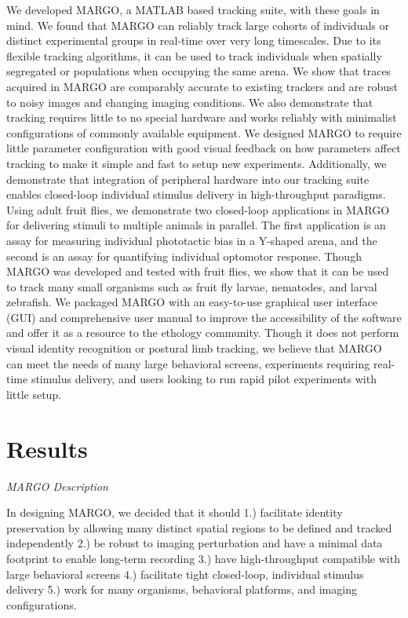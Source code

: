 \documentclass[10pt]{article}
\begin{document}
\begin{multicols}{2}
We developed MARGO, a MATLAB based tracking suite, with these goals in mind. We found that MARGO can reliably track large cohorts of individuals or distinct experimental groups in real-time over very long timescales. Due to its flexible tracking algorithms, it can be used to track individuals when spatially segregated or populations when occupying the same arena. We show that traces acquired in MARGO are comparably accurate to existing trackers and are robust to noisy images and changing imaging conditions. We also demonstrate that tracking requires little to no special hardware and works reliably with minimalist configurations of commonly available equipment. We designed MARGO to require little parameter configuration with good visual feedback on how parameters affect tracking to make it simple and fast to setup new experiments. Additionally, we demonstrate that integration of peripheral hardware into our tracking suite enables closed-loop individual stimulus delivery in high-throughput paradigms. Using adult fruit flies, we demonstrate two closed-loop applications in MARGO for delivering stimuli to multiple animals in parallel. The first application is an assay for measuring individual phototactic bias in a Y-shaped arena, and the second is an assay for quantifying individual optomotor response. Though MARGO was developed and tested with fruit flies, we show that it can be used to track many small organisms such as fruit fly larvae, nematodes, and larval zebrafish. We packaged MARGO with an easy-to-use graphical user interface (GUI) and comprehensive user manual to improve the accessibility of the software and offer it as a resource to the ethology community. Though it does not perform visual identity recognition or postural limb tracking, we believe that MARGO can meet the needs of many large behavioral screens, experiments requiring real-time stimulus delivery, and users looking to run rapid pilot experiments with little setup.

\section*{Results}

\textit{MARGO Description}

In designing MARGO, we decided that it should 1.) facilitate identity preservation by allowing many distinct spatial regions to be defined and tracked independently 2.) be robust to imaging perturbation and have a minimal data footprint to enable long-term recording 3.) have high-throughput compatible with large behavioral screens 4.) facilitate tight closed-loop, individual stimulus delivery 5.) work for many organisms, behavioral platforms, and imaging configurations.


\end{multicols}
\end{document}
